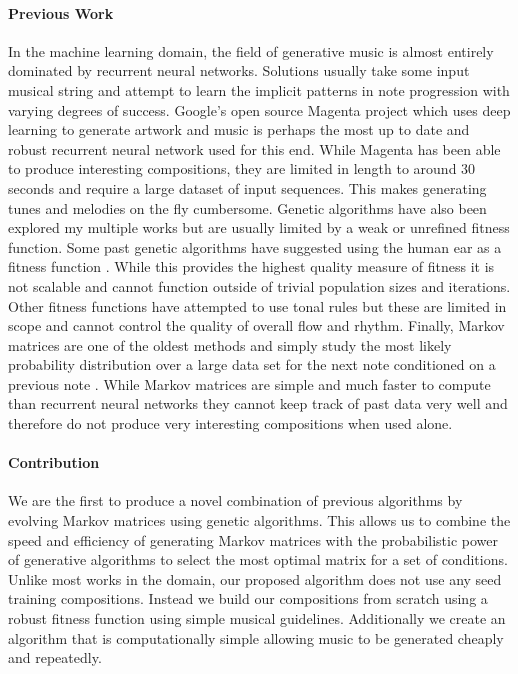 \documentclass{article}
\begin{document}
\paragraph{Previous Work} In the machine learning domain, the field of generative music is almost entirely dominated by recurrent neural networks. Solutions usually take some input musical string and attempt to learn the implicit patterns in note progression with varying degrees of success. Google's open source Magenta project \cite{weydeperception} which uses deep learning to generate artwork and music is perhaps the most up to date and robust recurrent neural network used for this end. While Magenta has been able to produce interesting compositions, they are limited in length to around 30 seconds and require a large dataset of input sequences. This makes generating tunes and melodies on the fly cumbersome. Genetic algorithms have also been explored my multiple works but are usually limited by a weak or unrefined fitness function. Some past genetic algorithms have suggested using the human ear as a fitness function \cite{miranda2001composing}. While this provides the highest quality measure of fitness it is not scalable and cannot function outside of trivial population sizes and iterations. Other fitness functions have attempted to use tonal rules \cite{matic2013genetic} but these are limited in scope and cannot control the quality of overall flow and rhythm. Finally, Markov matrices are one of the oldest methods and simply study the most likely probability distribution over a large data set for the next note conditioned on a previous note \cite{fernandez2013ai}. While Markov matrices are simple and much faster to compute than recurrent neural networks they cannot keep track of past data very well and therefore do not produce very interesting compositions when used alone.

\paragraph{Contribution} We are the first to produce a novel combination of previous algorithms by evolving Markov matrices using genetic algorithms. This allows us to combine the speed and efficiency of generating Markov matrices with the probabilistic power of generative algorithms to select the most optimal matrix for a set of conditions. Unlike most works in the domain, our proposed algorithm does not use any seed training compositions. Instead we build our compositions from scratch using a robust fitness function using simple musical guidelines. Additionally we create an algorithm that is computationally simple allowing music to be generated cheaply and repeatedly.
\end{document}
